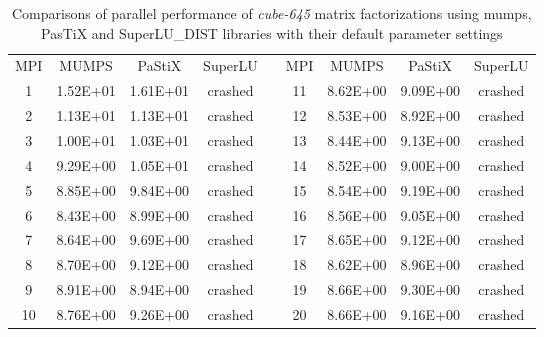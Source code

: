 \begin{table}[!t]
\centering
\begin{tabular}{|c|c|c|c|l|c|c|c|c|}
\cline{1-4} \cline{6-9}
MPI & MUMPS    & PaStiX   & SuperLU &  & MPI & MUMPS    & PaStiX   & SuperLU \\ \cline{1-4} \cline{6-9} 
1   & 1.52E+01 & 1.61E+01 & crashed &  & 11  & 8.62E+00 & 9.09E+00 & crashed \\ \cline{1-4} \cline{6-9} 
2   & 1.13E+01 & 1.13E+01 & crashed &  & 12  & 8.53E+00 & 8.92E+00 & crashed \\ \cline{1-4} \cline{6-9} 
3   & 1.00E+01 & 1.03E+01 & crashed &  & 13  & 8.44E+00 & 9.13E+00 & crashed \\ \cline{1-4} \cline{6-9} 
4   & 9.29E+00 & 1.05E+01 & crashed &  & 14  & 8.52E+00 & 9.00E+00 & crashed \\ \cline{1-4} \cline{6-9} 
5   & 8.85E+00 & 9.84E+00 & crashed &  & 15  & 8.54E+00 & 9.19E+00 & crashed \\ \cline{1-4} \cline{6-9} 
6   & 8.43E+00 & 8.99E+00 & crashed &  & 16  & 8.56E+00 & 9.05E+00 & crashed \\ \cline{1-4} \cline{6-9} 
7   & 8.64E+00 & 9.69E+00 & crashed &  & 17  & 8.65E+00 & 9.12E+00 & crashed \\ \cline{1-4} \cline{6-9} 
8   & 8.70E+00 & 9.12E+00 & crashed &  & 18  & 8.62E+00 & 8.96E+00 & crashed \\ \cline{1-4} \cline{6-9} 
9   & 8.91E+00 & 8.94E+00 & crashed &  & 19  & 8.66E+00 & 9.30E+00 & crashed \\ \cline{1-4} \cline{6-9} 
10  & 8.76E+00 & 9.26E+00 & crashed &  & 20  & 8.66E+00 & 9.16E+00 & crashed \\ \cline{1-4} \cline{6-9} 
\end{tabular}
\caption{Comparisons of parallel performance of  \textit{cube-645} matrix factorizations using \acrshort{mumps}, PasTiX and SuperLU\_DIST libraries with their default parameter settings}
\label{table:app-lc-cube-645-result}
\end{table}

\newpage